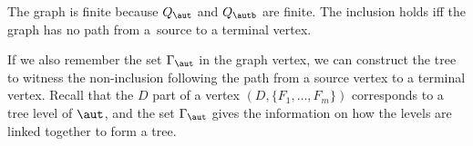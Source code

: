 The graph is finite because $Q_\aut$ and $Q_\autb$ are finite. The inclusion holds iff the graph has no path from a~source to a terminal vertex. 

 If we also remember the set $\Gamma_\aut$ in the graph vertex, we can construct the tree to witness the non-inclusion following the path from a source vertex to a terminal vertex. Recall that the $D$ part of a vertex $(D,\{F_1,\ldots,F_m\})$ corresponds to a tree level of $\aut$, and the set $\Gamma_\aut$ gives the information on how the levels are linked together to form a tree.

